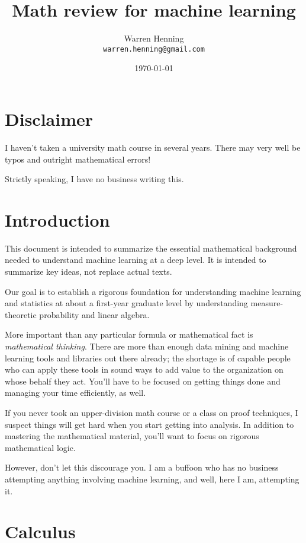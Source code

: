 \documentclass{article}
\begin{document}
\title{Math review for machine learning}
\author{Warren Henning\\\texttt{warren.henning@gmail.com}}
\date{\today}

\maketitle

\section{Disclaimer}

I haven't taken a university math course in several years. There may very well
be typos and outright mathematical errors!

Strictly speaking, I have no business writing this.

\section{Introduction}

This document is intended to summarize the essential mathematical background
needed to understand machine learning at a deep level. It is intended to
summarize key ideas, not replace actual texts.

Our goal is to establish a rigorous foundation for understanding machine
learning and statistics at about a first-year graduate level by understanding
measure-theoretic probability and linear algebra.

More important than any particular formula or mathematical fact is
\emph{mathematical thinking}. There are more than enough data mining and machine learning
tools and libraries out there already; the shortage is of capable people who
can apply these tools in sound ways to add value to the organization on whose
behalf they act. You'll have to be focused on getting things done and managing
your time efficiently, as well.

If you never took an upper-division math course or a class on proof techniques,
I suspect things will get hard when you start getting into analysis. In addition
to mastering the mathematical material, you'll want to focus on rigorous
mathematical logic.

However, don't let this discourage you. I am a buffoon who has no business
attempting anything involving machine learning, and well, here I am, attempting it.

\section{Calculus}
\end{document}
